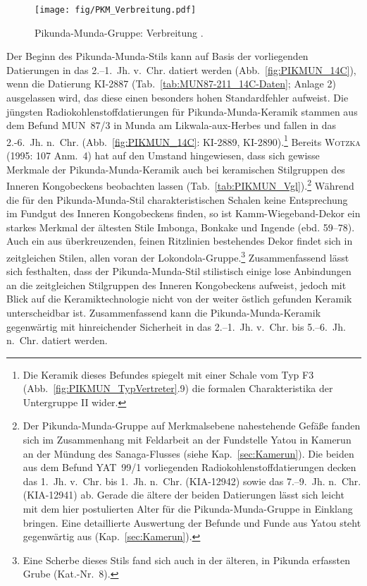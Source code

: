\begin{figure}[p]
	\centering
	\texttt{[image: fig/PKM\_Verbreitung.pdf]}
	\caption{Pikunda-Munda-Gruppe: Verbreitung \parencites[grau nach][119 Anm.~4, 531 Taf.~97.5]{Wotzka.1995}[114 Abb.~42]{Gillet.2013}.}
	\label{fig:PIKMUN_Verbreitung}
\end{figure}

Der Beginn des Pikunda-Munda-Stils kann auf Basis der vorliegenden Datierungen in das 2.--1.~Jh. v.~Chr. datiert werden (Abb.~\ref{fig:PIKMUN_14C}), wenn die Datierung KI-2887 (Tab.~\ref{tab:MUN87-211_14C-Daten}; Anlage 2) ausgelassen wird, das diese einen besonders hohen Standardfehler aufweist. Die jüngsten Radiokohlenstoffdatierungen für Pikunda-Munda-Keramik stammen aus dem Befund MUN~87/3 in Munda am \mbox{Likwala}-\mbox{aux}-\mbox{Herbes} und fallen in das 2.-6.~Jh. n.~Chr. (Abb.~\ref{fig:PIKMUN_14C}: KI-2889, KI-2890).\footnote{Die Keramik dieses Befundes spiegelt mit einer Schale vom Typ F3 (Abb.~\ref{fig:PIKMUN_TypVertreter}.9) die formalen Charakteristika der Untergruppe II wider.} Bereits \textsc{Wotzka} (1995: 107 Anm.~4) hat auf den Umstand hingewiesen, dass sich gewisse Merkmale der Pikunda-Munda-Keramik auch bei keramischen Stilgruppen des Inneren Kongobeckens beobachten lassen (Tab.~\ref{tab:PIKMUN_Vgl}).\footnote{Der Pikunda-Munda-Gruppe auf Merkmalsebene nahestehende Gefäße fanden sich im Zusammenhang mit Feldarbeit an der Fundstelle Yatou in Kamerun an der Mündung des Sanaga-Flusses (siehe Kap.~\ref{sec:Kamerun}). Die beiden aus dem Befund YAT~99/1 vorliegenden Radiokohlenstoffdatierungen decken das 1.~Jh. v.~Chr. bis 1.~Jh. n.~Chr. (KIA-12942) sowie das 7.--9.~Jh. n.~Chr. (KIA-12941) ab. Gerade die ältere der beiden Datierungen lässt sich leicht mit dem hier postulierten Alter für die Pikunda-Munda-Gruppe in Einklang bringen. Eine detaillierte Auswertung der Befunde und Funde aus Yatou steht gegenwärtig aus (Kap.~\ref{sec:Kamerun}).} Während die für den Pikunda-Munda-Stil charakteristischen Schalen keine Entsprechung im Fundgut des Inneren Kongobeckens finden, so ist Kamm-Wiegeband-Dekor ein starkes Merkmal der ältesten Stile Imbonga, Bonkake und Ingende (ebd. 59--78). Auch ein aus überkreuzenden, feinen Ritzlinien bestehendes Dekor findet sich in zeitgleichen Stilen, allen voran der Lokondola-Gruppe.\footnote{Eine Scherbe dieses Stils fand sich auch in der älteren, in Pikunda erfassten Grube (Kat.-Nr.~8).} Zusammenfassend lässt sich festhalten, dass der Pikunda-Munda-Stil stilistisch einige lose Anbindungen an die zeitgleichen Stilgruppen des Inneren Kongobeckens aufweist, jedoch mit Blick auf die Keramiktechnologie nicht von der weiter östlich gefunden Keramik unterscheidbar ist. Zusammenfassend kann die Pikunda-Munda-Keramik gegenwärtig mit hinreichender Sicherheit in das 2.--1.~Jh. v.~Chr. bis 5.--6.~Jh. n.~Chr. datiert werden.

